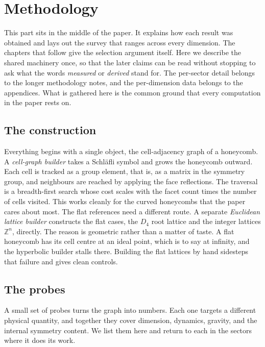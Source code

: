 \section{Methodology}

This part sits in the middle of the paper. It explains how each result was obtained and lays out the survey that
ranges across every dimension. The chapters that follow give the selection argument itself. Here we describe the
shared machinery once, so that the later claims can be read without stopping to ask what the words
\emph{measured} or \emph{derived} stand for. The per-sector detail belongs to the longer methodology notes, and
the per-dimension data belongs to the appendices. What is gathered here is the common ground that every
computation in the paper rests on.

\subsection{The construction}

Everything begins with a single object, the cell-adjacency graph of a honeycomb. A \emph{cell-graph builder}
takes a Schl\"afli symbol and grows the honeycomb outward. Each cell is tracked as a group element, that is, as a
matrix in the symmetry group, and neighbours are reached by applying the face reflections. The traversal is a
breadth-first search whose cost scales with the facet count times the number of cells visited. This works
cleanly for the curved honeycombs that the paper cares about most. The flat references need a different route.
A separate \emph{Euclidean lattice builder} constructs the flat cases, the $D_4$ root lattice and the integer
lattices $\mathbb{Z}^n$, directly. The reason is geometric rather than a matter of taste. A flat honeycomb has
its cell centre at an ideal point, which is to say at infinity, and the hyperbolic builder stalls there. Building
the flat lattices by hand sidesteps that failure and gives clean controls.

\subsection{The probes}

A small set of probes turns the graph into numbers. Each one targets a different physical quantity, and together
they cover dimension, dynamics, gravity, and the internal symmetry content. We list them here and return to each
in the sectors where it does its work.


